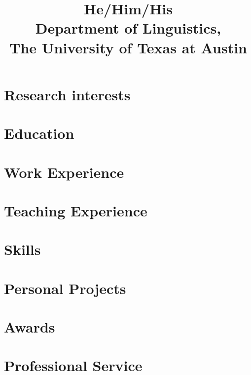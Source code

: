 \documentclass{practical-cv}
\title{He/Him/His\\Department of Linguistics,\\The University of Texas at Austin}
\begin{document}
\makecvtitle

\section{Research interests}


\section{Education}


\section{Work Experience}


\printbibliography[title=Publications, nottype=talk]

\printbibliography[title=Talks, type=talk]

\section{Teaching Experience}


\section{Skills}


\section{Personal Projects}


\section{Awards}


\section{Professional Service}

\end{document}
